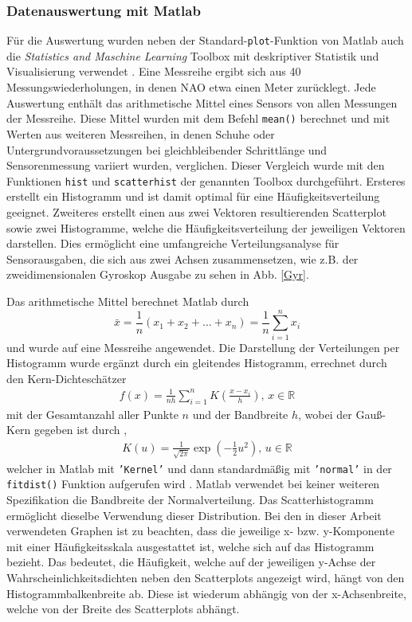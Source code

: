 \subsubsection*{Datenauswertung mit Matlab}
Für die Auswertung wurden neben der Standard-\texttt{plot}-Funktion von Matlab \cite{matlab} auch die \textit{Statistics and Maschine Learning} Toolbox mit deskriptiver Statistik und Visualisierung verwendet \cite{toolbox}. 
Eine Messreihe ergibt sich aus 40 Messungswiederholungen, in denen NAO etwa einen Meter zurücklegt. Jede Auswertung enthält das arithmetische Mittel eines Sensors von allen Messungen der Messreihe. Diese Mittel wurden mit dem Befehl \texttt{mean()} berechnet und mit Werten aus weiteren Messreihen, in denen Schuhe oder Untergrundvoraussetzungen bei gleichbleibender Schrittlänge und Sensorenmessung variiert wurden, verglichen. Dieser Vergleich wurde mit den Funktionen \texttt{hist} und \texttt{scatterhist} der genannten Toolbox durchgeführt. Ersteres erstellt ein Histogramm und ist damit optimal für eine Häufigkeitsverteilung geeignet. Zweiteres erstellt einen aus zwei Vektoren resultierenden Scatterplot sowie zwei Histogramme, welche die Häufigkeitsverteilung der jeweiligen Vektoren darstellen. Dies ermöglicht eine umfangreiche Verteilungsanalyse für Sensorausgaben, die sich aus zwei Achsen zusammensetzen, wie z.B. der zweidimensionalen Gyroskop Ausgabe zu sehen in Abb. \ref{Gyr}.

Das arithmetische Mittel berechnet Matlab durch \cite[S.50]{statistik_Ludwig}
\begin{equation} \label{mean}
	\bar{x} = \frac{1}{n} (x_1 + x_2 + \dots + x_n) = \frac{1}{n}\sum_{i=1}^{n}x_i
\end{equation}
und wurde auf eine Messreihe angewendet. Die Darstellung der Verteilungen per Histogramm wurde ergänzt durch ein gleitendes Histogramm, errechnet durch den Kern-Dichteschätzer \cite[S.93]{statistik_Ludwig}
\begin{align} \label{pdf}
	f(x)=\frac{1}{nh} \sum_{i=1}^{n}K\left(\frac{x - x_i}{h}\right),\, x \in \mathds{R}
\end{align}
mit der Gesamtanzahl aller Punkte $n$ und der Bandbreite $h$,
wobei der Gauß-Kern gegeben ist durch \cite[S.93]{statistik_Ludwig}, 
\begin{align}
	K(u) = \frac{1}{\sqrt{2\pi}} \exp\left(-\frac{1}{2}u^2\right),\, u \in \mathds{R}
\end{align}
welcher in Matlab mit \texttt{'Kernel'} und dann standardmäßig mit \texttt{'normal'} in der \texttt{fitdist()} Funktion aufgerufen wird \cite{kernel-distribution,fitdist}. Matlab verwendet bei keiner weiteren Spezifikation die Bandbreite der Normalverteilung. Das Scatterhistogramm ermöglicht dieselbe Verwendung dieser Distribution. Bei den in dieser Arbeit verwendeten Graphen ist zu beachten, dass die jeweilige x- bzw. y-Komponente mit einer Häufigkeitsskala ausgestattet ist, welche sich auf das Histogramm bezieht. Das bedeutet, die Häufigkeit, welche auf der jeweiligen y-Achse der Wahrscheinlichkeitsdichten neben den Scatterplots angezeigt wird, hängt von den Histogrammbalkenbreite ab. Diese ist wiederum abhängig von der x-Achsenbreite, welche von der Breite des Scatterplots abhängt. 

